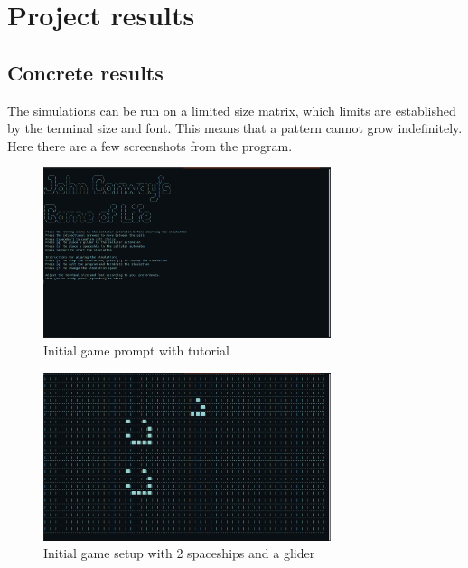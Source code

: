 \documentclass[10pt]{article}
\begin{document}
\newpage

\section{Project results }

\subsection{Concrete results}

The simulations can be run on a limited size matrix, which limits are established by the terminal size and font. This means that a pattern cannot grow indefinitely.
Here there are a few screenshots from the program.

\begin{figure}[h]
    \centering
    \includegraphics[width=0.75\textwidth]{images/prompt.png}
    \caption{Initial game prompt with tutorial}
    \label{fig:prompt}
\end{figure}

\begin{figure}[h]
    \centering
    \includegraphics[width=0.75\textwidth]{images/game.png}
    \caption{Initial game setup with 2 spaceships and a glider}
    \label{fig:initialize}
\end{figure}
\end{document}
